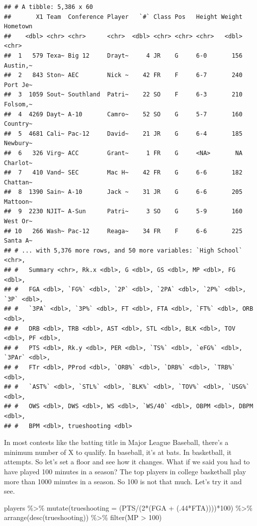 \documentclass[
]{book}
\newenvironment{Shaded}{\begin{snugshade}}{\end{snugshade}}
\newcommand{\AttributeTok}[1]{\textcolor[rgb]{0.77,0.63,0.00}{#1}}
\newcommand{\DecValTok}[1]{\textcolor[rgb]{0.00,0.00,0.81}{#1}}
\newcommand{\FunctionTok}[1]{\textcolor[rgb]{0.00,0.00,0.00}{#1}}
\newcommand{\NormalTok}[1]{#1}
\newcommand{\SpecialCharTok}[1]{\textcolor[rgb]{0.00,0.00,0.00}{#1}}
\begin{document}
\begin{verbatim}
## # A tibble: 5,386 x 60
##       X1 Team  Conference Player   `#` Class Pos   Height Weight Hometown
##    <dbl> <chr> <chr>      <chr>  <dbl> <chr> <chr> <chr>   <dbl> <chr>   
##  1   579 Texa~ Big 12     Drayt~     4 JR    G     6-0       156 Austin,~
##  2   843 Ston~ AEC        Nick ~    42 FR    F     6-7       240 Port Je~
##  3  1059 Sout~ Southland  Patri~    22 SO    F     6-3       210 Folsom,~
##  4  4269 Dayt~ A-10       Camro~    52 SO    G     5-7       160 Country~
##  5  4681 Cali~ Pac-12     David~    21 JR    G     6-4       185 Newbury~
##  6   326 Virg~ ACC        Grant~     1 FR    G     <NA>       NA Charlot~
##  7   410 Vand~ SEC        Mac H~    42 FR    G     6-6       182 Chattan~
##  8  1390 Sain~ A-10       Jack ~    31 JR    G     6-6       205 Mattoon~
##  9  2230 NJIT~ A-Sun      Patri~     3 SO    G     5-9       160 West Or~
## 10   266 Wash~ Pac-12     Reaga~    34 FR    F     6-6       225 Santa A~
## # ... with 5,376 more rows, and 50 more variables: `High School` <chr>,
## #   Summary <chr>, Rk.x <dbl>, G <dbl>, GS <dbl>, MP <dbl>, FG <dbl>,
## #   FGA <dbl>, `FG%` <dbl>, `2P` <dbl>, `2PA` <dbl>, `2P%` <dbl>, `3P` <dbl>,
## #   `3PA` <dbl>, `3P%` <dbl>, FT <dbl>, FTA <dbl>, `FT%` <dbl>, ORB <dbl>,
## #   DRB <dbl>, TRB <dbl>, AST <dbl>, STL <dbl>, BLK <dbl>, TOV <dbl>, PF <dbl>,
## #   PTS <dbl>, Rk.y <dbl>, PER <dbl>, `TS%` <dbl>, `eFG%` <dbl>, `3PAr` <dbl>,
## #   FTr <dbl>, PProd <dbl>, `ORB%` <dbl>, `DRB%` <dbl>, `TRB%` <dbl>,
## #   `AST%` <dbl>, `STL%` <dbl>, `BLK%` <dbl>, `TOV%` <dbl>, `USG%` <dbl>,
## #   OWS <dbl>, DWS <dbl>, WS <dbl>, `WS/40` <dbl>, OBPM <dbl>, DBPM <dbl>,
## #   BPM <dbl>, trueshooting <dbl>
\end{verbatim}

In most contests like the batting title in Major League Baseball, there's a minimum number of X to qualify. In baseball, it's at bats. In basketball, it attempts. So let's set a floor and see how it changes. What if we said you had to have played 100 minutes in a season? The top players in college basketball play more than 1000 minutes in a season. So 100 is not that much. Let's try it and see.

\begin{Shaded}
\begin{Highlighting}[]
\NormalTok{players }\SpecialCharTok{\%\textgreater{}\%}
  \FunctionTok{mutate}\NormalTok{(}\AttributeTok{trueshooting =}\NormalTok{ (PTS}\SpecialCharTok{/}\NormalTok{(}\DecValTok{2}\SpecialCharTok{*}\NormalTok{(FGA }\SpecialCharTok{+}\NormalTok{ (.}\DecValTok{44}\SpecialCharTok{*}\NormalTok{FTA))))}\SpecialCharTok{*}\DecValTok{100}\NormalTok{) }\SpecialCharTok{\%\textgreater{}\%}
  \FunctionTok{arrange}\NormalTok{(}\FunctionTok{desc}\NormalTok{(trueshooting)) }\SpecialCharTok{\%\textgreater{}\%}
  \FunctionTok{filter}\NormalTok{(MP }\SpecialCharTok{\textgreater{}} \DecValTok{100}\NormalTok{)}
\end{Highlighting}
\end{Shaded}
\end{document}
